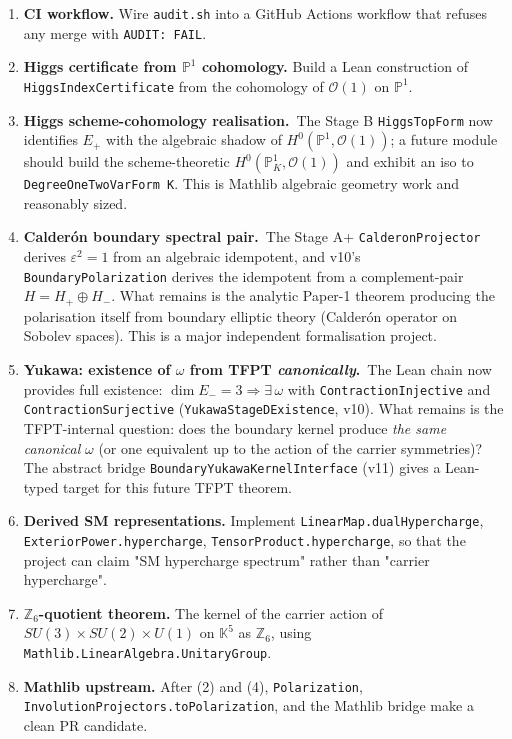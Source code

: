 \documentclass[11pt,a4paper]{article}
\begin{document}
\begin{enumerate}[leftmargin=1.6em, itemsep=2pt]
\item \textbf{CI workflow.}
    Wire \texttt{audit.sh} into a GitHub Actions workflow that
    refuses any merge with \texttt{AUDIT:\ FAIL}.

\item \textbf{Higgs certificate from $\mathbb P^1$ cohomology.}
    Build a Lean construction of \texttt{HiggsIndexCertificate}
    from the cohomology of $\mathcal O(1)$ on $\mathbb P^1$.

\item \textbf{Higgs scheme-cohomology realisation.}\ The
    Stage B \texttt{HiggsTopForm} now identifies $E_+$ with
    the algebraic shadow of $H^0(\mathbb P^1, \mathcal O(1))$;
    a future module should build the scheme-theoretic
    $H^0(\mathbb P^1_K, \mathcal O(1))$ and exhibit an iso to
    \texttt{DegreeOneTwoVarForm K}. This is Mathlib algebraic
    geometry work and reasonably sized.
\item \textbf{Calderón boundary spectral pair.}\ The Stage A+
    \texttt{CalderonProjector} derives $\varepsilon^2 = 1$
    from an algebraic idempotent, and v10's
    \texttt{BoundaryPolarization} derives the idempotent from
    a complement-pair $H = H_+ \oplus H_-$. What remains is the
    analytic Paper-1 theorem producing the polarisation itself
    from boundary elliptic theory (Calder\'on operator on
    Sobolev spaces). This is a major independent
    formalisation project.
\item \textbf{Yukawa: existence of $\omega$ from TFPT
    \emph{canonically}.}\ The Lean chain now provides full
    existence:
    $\dim E_- = 3 \Rightarrow \exists\,\omega$ with
    \texttt{ContractionInjective} and
    \texttt{ContractionSurjective}
    (\texttt{YukawaStageDExistence}, v10). What remains is
    the TFPT-internal question: does the boundary kernel
    produce \emph{the same canonical} $\omega$ (or one
    equivalent up to the action of the carrier symmetries)?
    The abstract bridge
    \texttt{BoundaryYukawaKernelInterface} (v11) gives a
    Lean-typed target for this future TFPT theorem.

\item \textbf{Derived SM representations.}
    Implement
    \texttt{LinearMap.dualHypercharge},
    \texttt{ExteriorPower.hypercharge},
    \texttt{TensorProduct.hypercharge},
    so that the project can claim "SM hypercharge spectrum"
    rather than "carrier hypercharge".

\item \textbf{$\mathbb Z_6$-quotient theorem.}
    The kernel of the carrier action of
    $SU(3)\times SU(2)\times U(1)$ on $\mathbb K^5$ as $\mathbb Z_6$,
    using \texttt{Mathlib.LinearAlgebra.UnitaryGroup}.

\item \textbf{Mathlib upstream.}
    After (2) and (4), \texttt{Polarization},
    \texttt{InvolutionProjectors.toPolarization}, and the
    Mathlib bridge make a clean PR candidate.
\end{enumerate}
\end{document}

